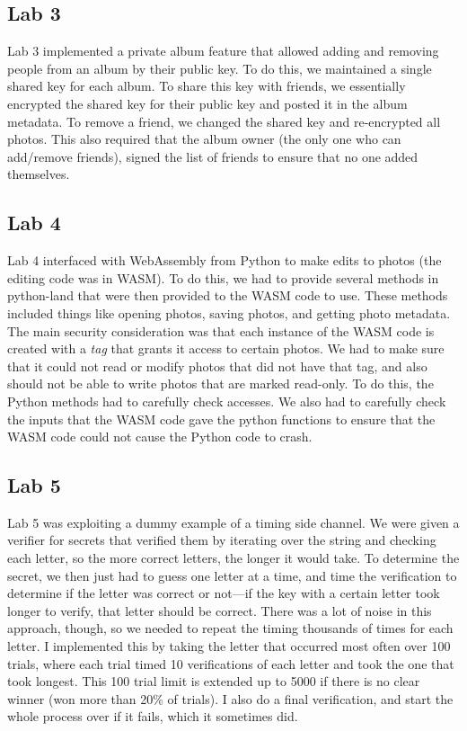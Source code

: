\documentclass{article}
\begin{document}
\begin{multicols*}{2}
\subsection{Lab 3}
Lab 3 implemented a private album feature that allowed adding and removing people from an album by their public key. To do this, we maintained a single shared key for each album. To share this key with friends, we essentially encrypted the shared key for their public key and posted it in the album metadata. To remove a friend, we changed the shared key and re-encrypted all photos. This also required that the album owner (the only one who can add/remove friends), signed the list of friends to ensure that no one added themselves.

\subsection{Lab 4}
Lab 4 interfaced with WebAssembly from Python to make edits to photos (the editing code was in WASM). To do this, we had to provide several methods in python-land that were then provided to the WASM code to use. These methods included things like opening photos, saving photos, and getting photo metadata. The main security consideration was that each instance of the WASM code is created with a \textit{tag} that grants it access to certain photos. We had to make sure that it could not read or modify photos that did not have that tag, and also should not be able to write photos that are marked read-only. To do this, the Python methods had to carefully check accesses. We also had to carefully check the inputs that the WASM code gave the python functions to ensure that the WASM code could not cause the Python code to crash.

\subsection{Lab 5}
Lab 5 was exploiting a dummy example of a timing side channel. We were given a verifier for secrets that verified them by iterating over the string and checking each letter, so the more correct letters, the longer it would take. To determine the secret, we then just had to guess one letter at a time, and time the verification to determine if the letter was correct or not---if the key with a certain letter took longer to verify, that letter should be correct. There was a lot of noise in this approach, though, so we needed to repeat the timing thousands of times for each letter. I implemented this by taking the letter that occurred most often over 100 trials, where each trial timed 10 verifications of each letter and took the one that took longest. This 100 trial limit is extended up to 5000 if there is no clear winner (won more than 20\% of trials). I also do a final verification, and start the whole process over if it fails, which it sometimes did. 

\end{multicols*}
\end{document}
